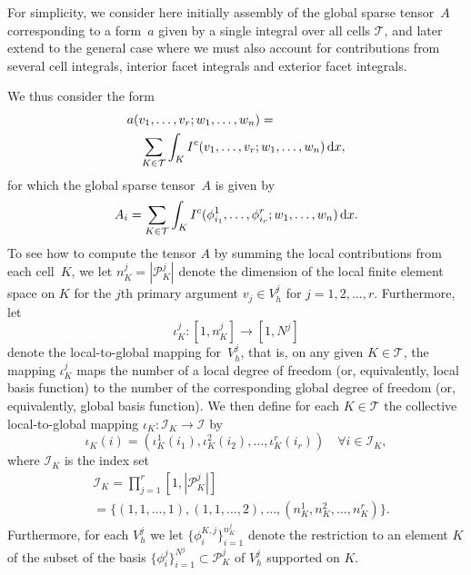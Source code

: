 For simplicity, we consider here initially assembly of the global
sparse tensor~$A$ corresponding to a form~$a$ given by a single
integral over all cells $\mathcal{T}$, and later extend to the general
case where we must also account for contributions from several cell
integrals, interior facet integrals and exterior facet integrals.

We thus consider the form
\begin{equation}
  \begin{split}
    &a(v_1, \ldots, v_r; w_1, \ldots, w_n) = \\
    & \ \ \ \sum_{K\in\mathcal{T}} \int_K
    I^c(v_1, \ldots, v_r; w_1, \ldots, w_n) \, \mathrm{d}x,
  \end{split}
\end{equation}
for which the global sparse tensor~$A$ is given by
\begin{equation}
  A_i = \sum_{K\in\mathcal{T}} \int_K
  I^c(\phi^1_{i_1}, \ldots, \phi^r_{i_r}; w_1, \ldots, w_n) \, \mathrm{d}x.
\end{equation}
To see how to compute the tensor $A$ by summing the local
contributions from each cell~$K$, we let $n^j_K = |\mathcal{P}^j_K|$
denote the dimension of the local finite element space on $K$ for the
$j$th primary argument $v_j \in V_h^j$ for $j = 1,2,\ldots,r$. Furthermore, let
\begin{equation}
  \iota_K^j : [1,n_K^j] \rightarrow [1,N^j] \label{eq:iota_K}
\end{equation}
denote the local-to-global mapping for~$V_h^j$, that is, on any given
$K\in\mathcal{T}$, the mapping $\iota_K^j$ maps the number of a local
degree of freedom (or, equivalently, local basis function) to the
number of the corresponding global degree of freedom (or,
equivalently, global basis function). We then define for each $K \in
\mathcal{T}$ the collective local-to-global mapping $\iota_K :
\mathcal{I}_K \rightarrow \mathcal{I}$ by
\begin{equation}
  \iota_K(i) =
  (\iota_K^1(i_1),\iota_K^2(i_2),\ldots,\iota_K^r(i_r))
  \quad \forall i \in \mathcal{I}_K,
\end{equation}
where $\mathcal{I}_K$ is the index set
\begin{equation}
\begin{split}
  & \mathcal{I}_K = \prod_{j=1}^r[1,|\mathcal{P}_K^j|] \\ 
  & = \{(1,1,\ldots,1), (1,1,\ldots,2), \ldots,
  (n_K^1,n_K^2,\ldots,n_K^r)\}.
\end{split}
\end{equation}
Furthermore, for each $V_h^j$ we let $\{\phi^{K,j}_i\}_{i=1}^{n_K^j}$
denote the restriction to an element $K$ of the subset of the basis
$\{\phi_i^j\}_{i=1}^{N^j} \subset \mathcal{P}_K^j$ of $V_h^j$ supported on $K$.

